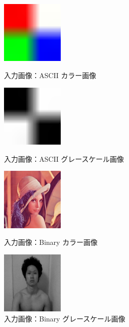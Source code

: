 \documentclass[10pt,a4paper]{jsarticle}
\begin{document}
\begin{figure}[htbp]
  \begin{minipage}{0.25\hsize}
    \begin{center}
    \includegraphics[width=30mm]{color4x4_ascii.jpg}
    \end{center}
    \caption{入力画像：ASCII カラー画像}
    \label{fig:sutehage}
  \end{minipage}
  \begin{minipage}{0.25\hsize}
    \begin{center}
      \includegraphics[width=30mm]{checker4x4_ascii.jpg}
    \end{center}
    \caption{入力画像：ASCII グレースケール画像}
    \label{fig:sutehage}
  \end{minipage}
  \begin{minipage}{0.25\hsize}
    \begin{center}
      \includegraphics[width=30mm]{lenna256x256binary.jpg}
    \end{center}
    
    \caption{入力画像：Binary カラー画像}
    \label{fig:sutehage}
  \end{minipage}
  \begin{minipage}{0.25\hsize}
    \begin{center}
      \includegraphics[width=30mm]{sutehage400x400binary.jpg}
    \end{center}
    \caption{入力画像：Binary グレースケール画像}
    \label{fig:sutehage}
  \end{minipage}
\end{figure}
\end{document}
